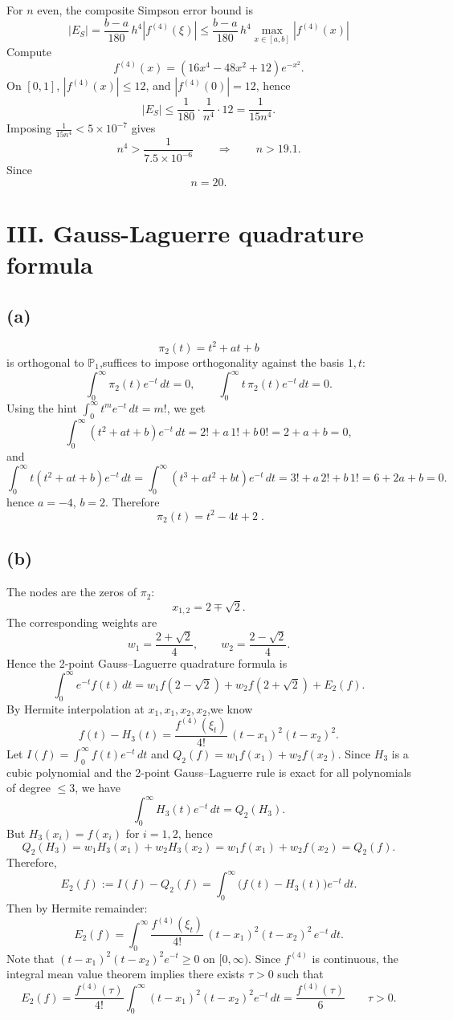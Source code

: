 \documentclass[a4paper]{article}
\begin{document}
For \(n\) even, the composite Simpson error bound is
\[
|E_S| = \frac{b-a}{180}\,h^{4}|f^{(4)}(\xi)|\le \frac{b-a}{180}\,h^{4}\max_{x\in[a,b]}|f^{(4)}(x)|
\]
Compute
\[
f^{(4)}(x)=(16x^{4}-48x^{2}+12)e^{-x^{2}}.
\]
On \([0,1]\), \(|f^{(4)}(x)|\le 12\), and \(|f^{(4)}(0)|=12\), hence 
\[
|E_S|\le \frac{1}{180}\cdot \frac{1}{n^{4}}\cdot 12=\frac{1}{15n^{4}}.
\]
Imposing \(\frac{1}{15n^{4}}<5\times 10^{-7}\) gives
\[
n^{4}>\frac{1}{7.5\times 10^{-6}}
\qquad\Rightarrow\qquad n>19.1.
\]
Since 
\[
\boxed{n=20}.
\]

\section*{III. Gauss-Laguerre quadrature formula}
\subsection*{(a)}

\[
\pi_2(t)=t^2+a t+b
\]
is orthogonal to \(\mathbb{P}_1\),suffices to impose orthogonality against the basis \(1,t\):
\[
\int_{0}^{\infty} \pi_2(t)e^{-t}\,dt=0,
\qquad
\int_{0}^{\infty} t\,\pi_2(t)e^{-t}\,dt=0.
\]
Using the hint \(\int_{0}^{\infty} t^m e^{-t}\,dt=m!\), we get
\[
\int_{0}^{\infty} (t^2+a t+b)e^{-t}\,dt = 2! + a\,1! + b\,0! = 2+a+b = 0,
\]
and
\[
\int_{0}^{\infty} t(t^2+a t+b)e^{-t}\,dt
= \int_{0}^{\infty} (t^3+a t^2+b t)e^{-t}\,dt
= 3! + a\,2! + b\,1! = 6+2a+b = 0.
\]
hence \(a=-4\), \(b=2\). Therefore
\[
\boxed{\;\pi_2(t)=t^2-4t+2\; }.
\]

\subsection*{(b)}

The nodes are the zeros of \(\pi_2\):
\[
x_{1,2}=2\mp \sqrt{2}.
\]
The corresponding weights are
\[
w_1=\frac{2+\sqrt{2}}{4},\qquad w_2=\frac{2-\sqrt{2}}{4}.
\]
Hence the 2-point Gauss--Laguerre quadrature formula is
\[
\int_{0}^{\infty} e^{-t} f(t)\,dt = w_1 f(2-\sqrt{2}) + w_2 f(2+\sqrt{2})+E_2(f).
\]
By Hermite interpolation at \(x_1,x_1,x_2,x_2\),we know
\[
f(t)-H_3(t)=\frac{f^{(4)}(\xi_t)}{4!}\,(t-x_1)^2(t-x_2)^2.
\]
Let \(I(f)=\int_{0}^{\infty} f(t)e^{-t}\,dt\) and \(Q_2(f)=w_1 f(x_1)+w_2 f(x_2)\).
Since \(H_3\) is a cubic polynomial and the 2-point Gauss--Laguerre rule is exact for all
polynomials of degree \(\le 3\), we have
\[
\int_{0}^{\infty} H_3(t)e^{-t}\,dt=Q_2(H_3).
\]
But \(H_3(x_i)=f(x_i)\) for \(i=1,2\), hence
\[
Q_2(H_3)=w_1 H_3(x_1)+w_2 H_3(x_2)=w_1 f(x_1)+w_2 f(x_2)=Q_2(f).
\]
Therefore,
\[
E_2(f):=I(f)-Q_2(f)=\int_{0}^{\infty}\bigl(f(t)-H_3(t)\bigr)e^{-t}\,dt.
\]
Then by Hermite remainder:
\[
E_2(f)=\int_{0}^{\infty}\frac{f^{(4)}(\xi_t)}{4!}\,(t-x_1)^2(t-x_2)^2\,e^{-t}\,dt.
\]
Note that \((t-x_1)^2(t-x_2)^2e^{-t}\ge 0\) on \([0,\infty)\). Since \(f^{(4)}\) is continuous,
the integral mean value theorem implies there exists \(\tau>0\) such that
\[
\boxed{
E_2(f)=\frac{f^{(4)}(\tau)}{4!}\int_{0}^{\infty}(t-x_1)^2(t-x_2)^2e^{-t}\,dt = \frac{f^{(4)}(\tau)}{6}
\qquad \tau>0.
}
\]
\end{document}
